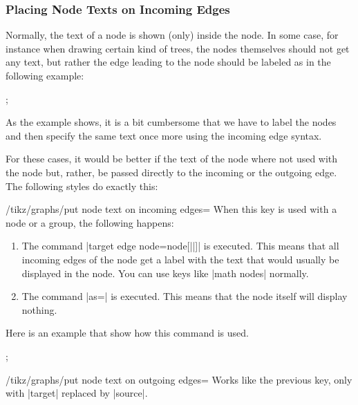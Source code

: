 \subsubsection{Placing Node Texts on Incoming Edges}

Normally, the text of a node is shown (only) inside the node. In some case, for
instance when drawing certain kind of trees, the nodes themselves should not
get any text, but rather the edge leading to the node should be labeled as in
the following example:
%
\begin{codeexample}[preamble={\usetikzlibrary{graphs,quotes}}]
\tikz {};
\end{codeexample}
%
As the example shows, it is a bit cumbersome that we have to label the nodes
and then specify the same text once more using the incoming edge syntax.

For these cases, it would be better if the text of the node where not used with
the node but, rather, be passed directly to the incoming or the outgoing edge.
The following styles do exactly this:

\begin{key}{/tikz/graphs/put node text on incoming edges=}
    When this key is used with a node or a group, the following happens:
    \begin{enumerate}
        \item The command
            |target edge node={node[||]{\tikzgraphnodetext}}| is
            executed. This means that all incoming edges of the node get a
            label with the text that would usually be displayed in the node.
            You can use keys like |math nodes| normally.
        \item The command |as={}| is executed. This means that the node itself
            will display nothing.
    \end{enumerate}
    Here is an example that show how this command is used.
\begin{codeexample}[preamble={\usetikzlibrary{graphs}}]
\tikz {};
\end{codeexample}
\end{key}

\begin{key}{/tikz/graphs/put node text on outgoing edges=}
    Works like the previous key, only with |target| replaced by |source|.
\end{key}


